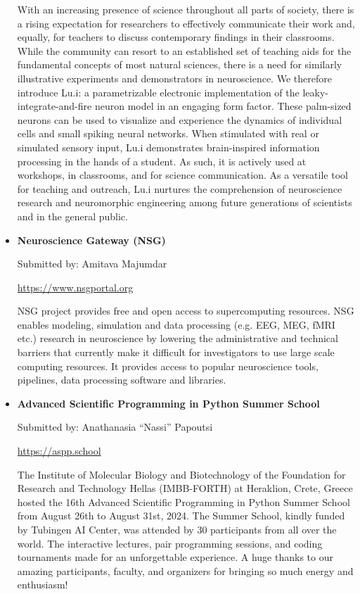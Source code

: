 \begin{itemize}
        With an increasing presence of science throughout all parts of society, there is a rising expectation for researchers to effectively communicate their work and, equally, for teachers to discuss contemporary findings in their classrooms. While the community can resort to an established set of teaching aids for the fundamental concepts of most natural sciences, there is a need for similarly illustrative experiments and demonstrators in neuroscience. We therefore introduce Lu.i: a parametrizable electronic implementation of the leaky-integrate-and-fire neuron model in an engaging form factor. These palm-sized neurons can be used to visualize and experience the dynamics of individual cells and small spiking neural networks. When stimulated with real or simulated sensory input, Lu.i demonstrates brain-inspired information processing in the hands of a student. As such, it is actively used at workshops, in classrooms, and for science communication. As a versatile tool for teaching and outreach, Lu.i nurtures the comprehension of neuroscience research and neuromorphic engineering among future generations of scientists and in the general public.

    \item \textbf{Neuroscience Gateway (NSG)}

        Submitted by: Amitava Majumdar

        \url{https://www.nsgportal.org}

        NSG project provides free and open access to supercomputing resources. NSG enables modeling, simulation and data processing (e.g. EEG, MEG, fMRI etc.) research in neuroscience by lowering the administrative and technical barriers that currently make it difficult for investigators to use large scale computing resources. It provides access to popular neuroscience tools, pipelines, data processing software and libraries.


\end{itemize}
\newpage
\begin{itemize}
    \item \textbf{Advanced Scientific Programming in Python Summer School}

        Submitted by: Anathanasia \enquote{Nassi} Papoutsi

        \url{https://aspp.school}

        The Institute of Molecular Biology and Biotechnology of the Foundation for Research and Technology Hellas (IMBB-FORTH) at Heraklion, Crete, Greece hosted the 16th Advanced Scientific Programming in Python Summer School from August 26th to August 31st, 2024. The Summer School, kindly funded by Tubingen AI Center, was attended by 30 participants from all over the world. The interactive lectures, pair programming sessions, and coding tournaments made for an unforgettable experience. A huge thanks to our amazing participants, faculty, and organizers for bringing so much energy and enthusiasm!

\end{itemize}

